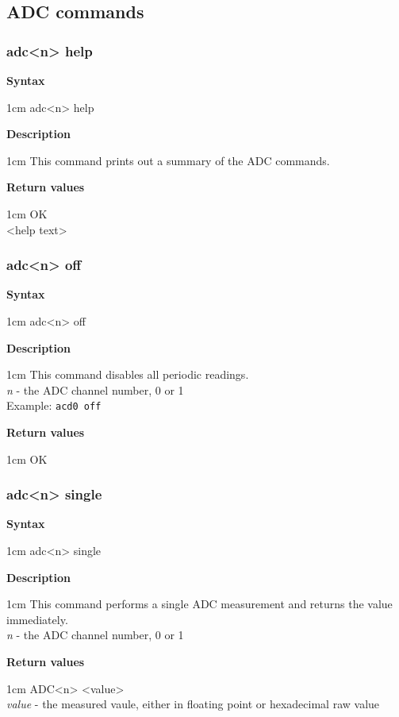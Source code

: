 \documentclass{article}[a4paper]
\begin{document}
\subsection{ADC commands}
\subsubsection{adc<n> help}
\begin{tcolorbox}
	{\bf Syntax}

	 1cm \dimexpr\linewidth-2cm\relax
	adc<n> help

	\medskip
	{\bf Description}

	 1cm \dimexpr\linewidth-2cm\relax
	This command prints out a summary of the ADC commands.

	\medskip
	{\bf Return values}

	 1cm \dimexpr\linewidth-2cm\relax
	OK \\
	<help text>
\end{tcolorbox}

\subsubsection{adc<n> off}
\begin{tcolorbox}
	{\bf Syntax}

	 1cm \dimexpr\linewidth-2cm\relax
	adc<n> off

	\medskip
	{\bf Description}

	 1cm \dimexpr\linewidth-2cm\relax
	This command disables all periodic readings. \\
	\medskip
	{\it n} - the ADC channel number, 0 or 1 \\
	\medskip
	Example: \texttt{acd0 off}

	\medskip
	{\bf Return values}

	 1cm \dimexpr\linewidth-2cm\relax
	OK
\end{tcolorbox}

\subsubsection{adc<n> single}
\begin{tcolorbox}
	{\bf Syntax}

	 1cm \dimexpr\linewidth-2cm\relax
	adc<n> single

	\medskip
	{\bf Description}

	 1cm \dimexpr\linewidth-2cm\relax
	This command performs a single ADC measurement and returns the value
	immediately. \\
	\medskip
	{\it n} - the ADC channel number, 0 or 1

	\medskip
	{\bf Return values}

	 1cm \dimexpr\linewidth-2cm\relax
	ADC<n> <value> \\
	{\it value} - the measured vaule, either in floating point or hexadecimal
	raw value
\end{tcolorbox}
\end{document}
